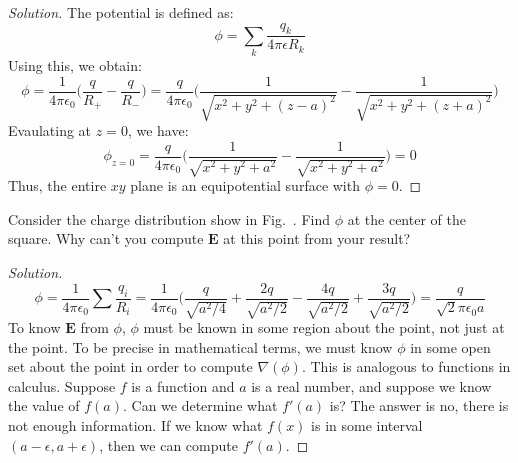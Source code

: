             \begin{proof}[Solution]
                The potential is defined as:
                \begin{equation*}
                    \phi=\sum_{k}\frac{q_{k}}{4\pi\epsilon{R_{k}}}
                \end{equation*}
                Using this, we obtain:
                \begin{equation*}
                    \phi
                    =\frac{1}{4\pi\epsilon_0}\bigg(
                        \frac{q}{R_{+}}-\frac{q}{R_{-}}
                    \bigg)
                    =\frac{q}{4\pi\epsilon_0}
                    \bigg(
                        \frac{1}{\sqrt{x^2+y^2+(z-a)^2}}
                        -\frac{1}{\sqrt{x^2+y^2+(z+a)^2}}
                    \bigg)
                \end{equation*}
                Evaulating at $z=0$, we have:
                \begin{equation*}
                    \phi_{z=0}
                    =\frac{q}{4\pi\epsilon_0}\bigg(
                        \frac{1}{\sqrt{x^2+y^2+a^2}}
                        -\frac{1}{\sqrt{x^2+y^2+a^2}}
                    \bigg)
                    =0
                \end{equation*}
                Thus, the entire $xy$ plane is an
                equipotential surface with $\phi=0$.
            \end{proof}
            \begin{problem}[Wangsness 5-4]
                \label{problem:EMAG_Wangsness_5_4}
                Consider the charge distribution show in
                Fig.~.
                Find $\phi$ at the center of the square.
                Why can't you compute $\mathbf{E}$ at this
                point from your result?
            \end{problem}
            \begin{proof}[Solution]
            \begin{equation*}
                \phi=\frac{1}{4\pi\epsilon_{0}}
                \sum\frac{q_{i}}{R_{i}}
                =\frac{1}{4\pi \epsilon_0}\bigg(
                    \frac{q}{\sqrt{a^2/4}}
                    +\frac{2q}{\sqrt{a^2/2}}
                    -\frac{4q}{\sqrt{a^2/2}}
                    +\frac{3q}{\sqrt{a^2/2}}
                \bigg)
                =\frac{q}{\sqrt{2}\pi\epsilon_{0}a}    
            \end{equation*}
            To know $\mathbf{E}$ from $\phi$,
            $\phi$ must be known in some region about the point,
            not just at the point. To be precise in mathematical terms,
            we must know $\phi$ in some open set about the point in
            order to compute $\nabla(\phi)$. This is analogous to
            functions in calculus. Suppose $f$ is a function and
            $a$ is a real number, and suppose we know the value
            of $f(a)$. Can we determine what $f'(a)$ is?
            The answer is no, there is not enough information.
            If we know what $f(x)$ is in some interval $(a-\epsilon,a+\epsilon)$, then we can compute $f'(a)$.
            \end{proof}
